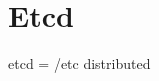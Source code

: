 \section{Etcd}

\begin{frame}
etcd = /etc distributed

\begin{itemize}

\end{itemize}

\end{frame}

